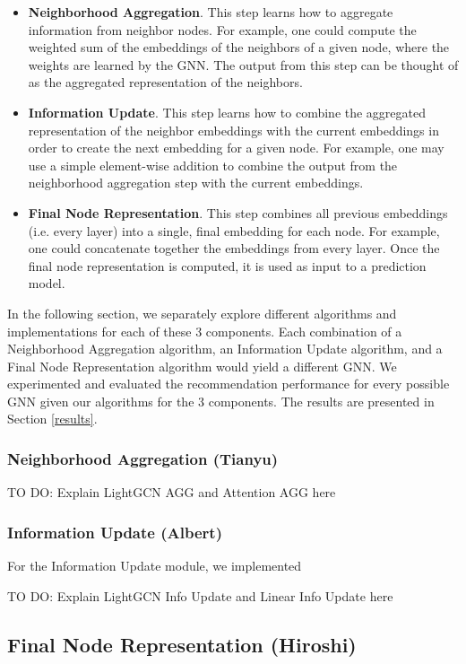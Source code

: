 \documentclass{article}
\begin{document}
\begin{itemize}
    \item \textbf{Neighborhood Aggregation}. This step learns how to aggregate information from neighbor nodes. For example, one could compute the weighted sum of the embeddings of the neighbors of a given node, where the weights are learned by the GNN. The output from this step can be thought of as the aggregated representation of the neighbors.
    \item \textbf{Information Update}. This step learns how to combine the aggregated representation of the neighbor embeddings with the current embeddings in order to create the next embedding for a given node. For example, one may use a simple element-wise addition to combine the output from the neighborhood aggregation step with the current embeddings.
    \item \textbf{Final Node Representation}. This step combines all previous embeddings (i.e. every layer) into a single, final embedding for each node. For example, one could concatenate together the embeddings from every layer. Once the final node representation is computed, it is used as input to a prediction model.
\end{itemize}

In the following section, we separately explore different algorithms and implementations for each of these 3 components. Each combination of a Neighborhood Aggregation algorithm, an Information Update algorithm, and a Final Node Representation algorithm would yield a different GNN. We experimented and evaluated the recommendation performance for every possible GNN given our algorithms for the 3 components. The results are presented in Section \ref{results}.

\subsubsection{Neighborhood Aggregation (Tianyu)}

TO DO: Explain LightGCN AGG and Attention AGG here

\subsubsection{Information Update (Albert)}

For the Information Update module, we implemented

TO DO: Explain LightGCN Info Update and Linear Info Update here

\subsection{Final Node Representation (Hiroshi)}
\end{document}
